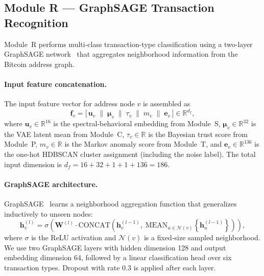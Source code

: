 \documentclass[journal]{IEEEtran}
\begin{document}
\subsection{Module R — GraphSAGE Transaction Recognition}
\label{sec:module_r}

Module~R performs multi-class transaction-type classification using a
two-layer GraphSAGE network~\cite{Hamilton2017} that aggregates
neighborhood information from the Bitcoin address graph.

\paragraph{Input feature concatenation.}
The input feature vector for address node $v$ is assembled as
\begin{equation}
  \mathbf{f}_v =
    \bigl[\,
      \mathbf{u}_v \;\|\;
      \boldsymbol{\mu}_v \;\|\;
      \tau_v \;\|\;
      m_v \;\|\;
      \mathbf{e}_v
    \,\bigr]
    \in \mathbb{R}^{d_f},
  \label{eq:feat_concat}
\end{equation}
where $\mathbf{u}_v \in \mathbb{R}^{16}$ is the spectral-behavioral embedding
from Module~S, $\boldsymbol{\mu}_v \in \mathbb{R}^{32}$ is the VAE latent
mean from Module~C, $\tau_v \in \mathbb{R}$ is the Bayesian trust score from
Module~P, $m_v \in \mathbb{R}$ is the Markov anomaly score from Module~T, and
$\mathbf{e}_v \in \mathbb{R}^{136}$ is the one-hot HDBSCAN cluster assignment
(including the noise label).
The total input dimension is $d_f = 16 + 32 + 1 + 1 + 136 = 186$.

\paragraph{GraphSAGE architecture.}
GraphSAGE~\cite{Hamilton2017} learns a neighborhood aggregation
function that generalizes inductively to unseen nodes:
\begin{equation}
  \mathbf{h}_v^{(l)}
    = \sigma\!\left(
        \mathbf{W}^{(l)}
        \cdot
        \mathrm{CONCAT}\!\left(
          \mathbf{h}_v^{(l-1)},\;
          \mathrm{MEAN}_{u \in \mathcal{N}(v)}\!\left\{
            \mathbf{h}_u^{(l-1)}
          \right\}
        \right)
      \right),
  \label{eq:graphsage}
\end{equation}
where $\sigma$ is the ReLU activation and $\mathcal{N}(v)$ is a fixed-size
sampled neighborhood.
We use two GraphSAGE layers with hidden dimension 128 and output embedding
dimension 64, followed by a linear classification head over six transaction
types.
Dropout with rate $0.3$ is applied after each layer.
\end{document}
